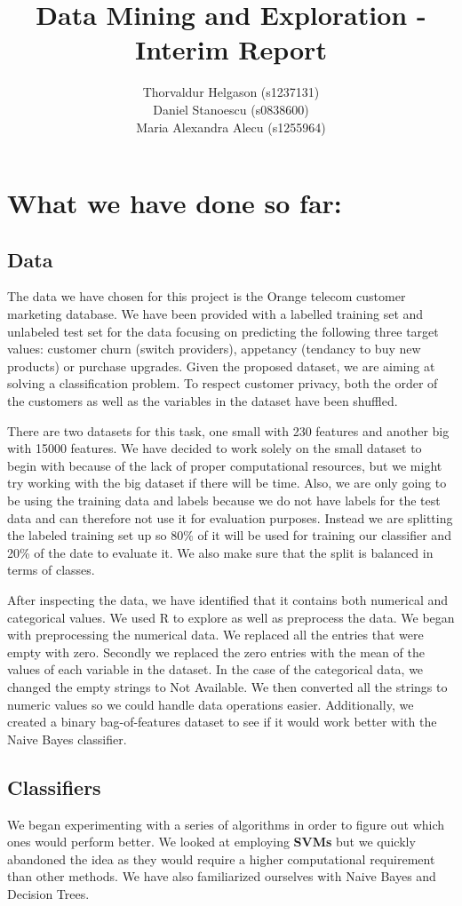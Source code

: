 \documentclass[a4paper,11pt]{article}
\title{Data Mining and Exploration - Interim Report}
\author{Thorvaldur Helgason (s1237131) \\
Daniel Stanoescu (s0838600) \\
Maria Alexandra Alecu (s1255964)}
\begin{document}
    
\maketitle

\section*{What we have done so far:}
\subsection*{Data}
The data we have chosen for this project is the Orange telecom customer marketing database. We have been provided with a labelled training set and unlabeled test set for the data focusing on predicting the following three target values: customer churn (switch providers), appetancy (tendancy to buy new products) or purchase upgrades. Given the proposed dataset, we are aiming at solving a classification problem. To respect customer privacy, both the order of the customers as well as the variables in the dataset have been shuffled.

There are two datasets for this task, one small with 230 features and another big with 15000 features. We have decided to work solely on the small dataset to begin with because of the lack of proper computational resources, but we might try working with the big dataset if there will be time. Also, we are only going to be using the training data and labels because we do not have labels for the test data and can therefore not use it for evaluation purposes. Instead we are splitting the labeled training set up so 80\% of it will be used for training our classifier and 20\% of the date to evaluate it. We also make sure that the split is balanced in terms of classes.

After inspecting the data, we have identified that it contains both numerical and categorical values. We used R to explore as well as preprocess the data. We began with preprocessing the numerical data. We replaced all the entries that were empty with zero. Secondly we replaced the zero entries with the mean of the values of each variable in the dataset. In the case of the categorical data, we changed the empty strings to Not Available. We then converted all the strings to numeric values so we could handle data operations easier. Additionally, we created a binary bag-of-features dataset to see if it would work better with the Naive Bayes classifier. 


\subsection*{Classifiers}
We began experimenting with a series of algorithms in order to figure out which ones would perform better. We looked at employing \textbf{SVMs} but we quickly abandoned the idea as they would require a higher computational requirement than other methods. We have also familiarized ourselves with Naive Bayes and Decision Trees.
\end{document}
